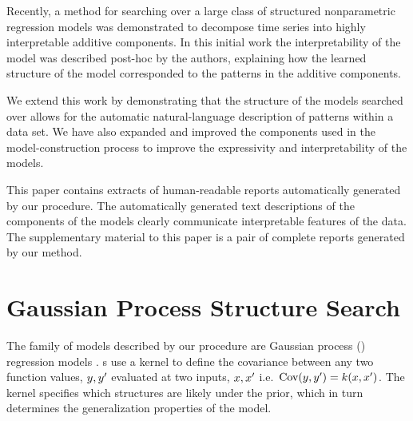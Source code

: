 \documentclass{article} %
\def\ie{i.e.\ }
\begin{document}
Recently, a method for searching over a large class of structured nonparametric regression models \citep{DuvLloGroetal13} was demonstrated to decompose time series into highly interpretable additive components.
In this initial work the interpretability of the model was described post-hoc by the authors, explaining how the learned structure of the model corresponded to the patterns in the additive components.

We extend this work by demonstrating that the structure of the models searched over allows for the automatic natural-language description of patterns within a data set.
We have also expanded and improved the components used in the model-construction process to improve the expressivity and interpretability of the models.

This paper contains extracts of human-readable reports automatically generated by our procedure.
The automatically generated text descriptions of the components of the models clearly communicate interpretable features of the data.
The supplementary material to this paper is a pair of complete reports generated by our method.



\section{Gaussian Process Structure Search}
\label{sec:gpss}
\vspace{-0.08in}

The family of models described by our procedure are Gaussian process (\gp{}) regression models \cite{rasmussen38gaussian}.
%
\gp{}s use a kernel to define the covariance between any two function values, $y, y'$ evaluated at two inputs, $x,x'$ \ie ${\textrm{Cov}(y, y') = k(x,x')}$.
The kernel specifies which structures are likely under the \gp{} prior, which in turn determines the generalization properties of the model.
\end{document}
